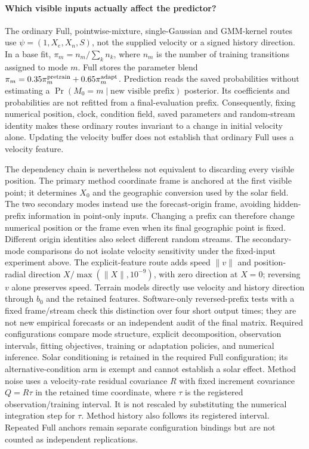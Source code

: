 \documentclass[11pt]{article}
\begin{document}
\paragraph{Which visible inputs actually affect the predictor?}
The ordinary Full, pointwise-mixture, single-Gaussian and GMM-kernel routes
use \(\psi=(1,X_e,X_n,S)\), not the supplied velocity or a signed history
direction. In a base fit, \(\pi_m=n_m/\sum_k n_k\), where \(n_m\) is the
number of training transitions assigned to mode \(m\).
Full stores the parameter blend
\(\pi_m=0.35\pi_m^{\rm pretrain}+0.65\pi_m^{\rm adapt}\).
Prediction reads the saved probabilities without estimating a
\(\Pr(M_0=m\mid\text{new visible prefix})\) posterior. Its coefficients and
probabilities are not refitted from a final-evaluation prefix.
Consequently, fixing numerical position, clock, condition field, saved
parameters and random-stream identity makes these ordinary routes invariant
to a change in initial velocity alone. Updating the velocity buffer does
not establish that ordinary Full uses a velocity feature.

The dependency chain is nevertheless not equivalent to discarding every
visible position. The primary method coordinate frame is anchored at the
first visible point; it determines \(X_0\) and the geographic conversion
used by the solar field. The two secondary modes instead use the
forecast-origin frame, avoiding hidden-prefix information in point-only
inputs. Changing a prefix can therefore change numerical position or the
frame even when its final geographic point is fixed. Different origin
identities also select different random streams. The secondary-mode
comparisons do not isolate velocity sensitivity under the fixed-input
experiment above. The explicit-feature route adds speed
\(\|v\|\) and position-radial direction
\(X/\max(\|X\|,10^{-9})\), with zero direction at \(X=0\);
reversing \(v\) alone preserves speed. Terrain models directly use
velocity and history direction through \(b_0\) and the retained features.
Software-only reversed-prefix tests with a fixed frame/stream check this
distinction over four short output times; they are not new empirical
forecasts or an independent audit of the final matrix.
Required configurations compare mode structure, explicit decomposition, observation
intervals, fitting objectives, training or adaptation policies, and numerical
inference. Solar conditioning is retained in the required Full configuration;
its alternative-condition arm is exempt and cannot establish a solar effect.
Method noise uses a velocity-rate residual
covariance \(R\) with fixed increment covariance \(Q=R\tau\) in the retained time coordinate, where
\(\tau\) is the registered observation/training interval. It is not rescaled
by substituting the numerical integration step for \(\tau\). Method history
also follows its registered interval. Repeated Full anchors remain separate
configuration bindings but are not counted as independent replications.
\end{document}
